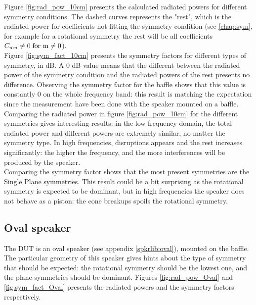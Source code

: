 \documentclass{report}
\begin{document}
Figure \ref{fig:rad_pow_10cm} presents the calculated radiated powers for different symmetry conditions. The dashed curves represents the "rest", which is the radiated power for coefficients not fitting the symmetry condition (see \ref{chap:sym}, for example for a rotational symmetry the rest will be all coefficients $C_{mn} \neq 0 \;  \textup{for m}  \neq 0$). \\

Figure \ref{fig:sym_fact_10cm} presents the symmetry factors for different types of symmetry, in dB. A 0 dB value means that the different between the radiated power of the symmetry condition and the radiated powers of the rest presents no difference. Observing the symmetry factor for the baffle shows that this value is constantly 0 on the whole frequency band: this result is matching the expectation since the measurement have been done with the speaker mounted on a baffle. \\

Comparing the radiated power in figure \ref{fig:rad_pow_10cm} for the different symmetries gives interesting results: in the low frequency domain, the total radiated power and different powers are extremely similar, no matter the symmetry type. In high frequencies, disruptions appears and the rest increases significantly: the higher the frequency, and the more interferences will be produced by the speaker. \\

Comparing the symmetry factor shows that the most present symmetries are the Single Plane symmetries. This result could be a bit surprising as the rotational symmetry is expected to be dominant, but in high frequencies the speaker does not behave as a piston: the cone breakups spoils the rotational symmetry. 

\subsection{Oval speaker}
The DUT is an oval speaker (see appendix \ref{spkrlib:oval}), mounted on the baffle. The particular geometry of this speaker gives hints about the type of symmetry that should be expected: the rotational symmetry should be the lowest one, and the plane symmetries should be dominant.  Figures \ref{fig:rad_pow_Oval} and \ref{fig:sym_fact_Oval} presents the radiated powers and the symmetry factors respectively.\\
\end{document}
